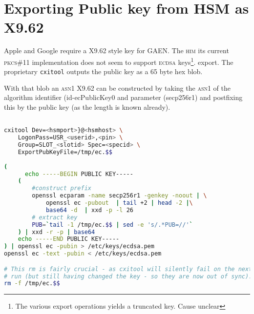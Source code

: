 \documentclass[11pt,a4]{article}
\begin{document}
\preamble
\newcommand{\chapter}{\section}

\section*{Exporting Public key from HSM as X9.62}

Apple and Google require a X9.62 style key for GAEN. The \textsc{him} its current \textsc{pkcs\#11} implementation does not seem to support \textsc{ecdsa} keys\footnote{The various export operations yields a truncated key. Cause unclear}. export. The proprietary { \texttt{cxitool}} outputs the public key as a 65 byte hex blob.

With that blob an \textsc{asn1} X9.62 can be constructed by taking the \textsc{asn1} of the algorithm identifier (id-ecPublicKey0  and parameter (secp256r1) and postfixing this by the public key (as the length is known already).

\begin{lstlisting}[language=bash,]

cxitool Dev=<hsmport>}@<hsmhost> \
	LogonPass=USR_<userid>,<pin> \
	Group=SLOT_<slotid> Spec=<specid> \
	ExportPubKeyFile=/tmp/ec.$$
	
(
	  echo -----BEGIN PUBLIC KEY----- 
	(
		#construct prefix
		openssl ecparam -name secp256r1 -genkey -noout | \
			openssl ec -pubout  | tail +2 | head -2 |\
			base64 -d  | xxd -p -l 26
		# extract key 
		PUB=`tail -1 /tmp/ec.$$ | sed -e 's/.*PUB=//'`
	) | xxd -r -p | base64
	echo -----END PUBLIC KEY----- 
) | openssl ec -pubin > /etc/keys/ecdsa.pem
openssl ec -text -pubin < /etc/keys/ecdsa.pem

# This rm is fairly crucial - as cxitool will silently fail on the next
# run (but still having changed the key - so they are now out of sync).
rm -f /tmp/ec.$$

\end{lstlisting}



\closingpage
\end{document}
